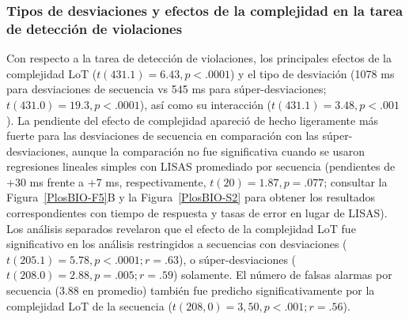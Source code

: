 \subsubsection*{Tipos de desviaciones y efectos de la complejidad en la tarea de detección de violaciones}


Con respecto a la tarea de detección de violaciones, los principales efectos de la complejidad LoT ($t (431.1) = 6.43, p < .0001$) y el tipo de desviación (1078 ms para desviaciones de secuencia vs 545 ms para súper-desviaciones; $t (431.0) = 19.3, p < .0001$), así como su interacción ($t (431.1) = 3.48, p < .001$). La pendiente del efecto de complejidad apareció de hecho ligeramente más fuerte para las desviaciones de secuencia en comparación con las súper-desviaciones, aunque la comparación no fue significativa cuando se usaron regresiones lineales simples con LISAS promediado por secuencia (pendientes de +30 ms frente a +7 ms, respectivamente, $t (20) = 1.87, p = .077$; consultar la Figura~\ref{PlosBIO-F5}B y la Figura~\ref{PlosBIO-S2} para obtener los resultados correspondientes con tiempo de respuesta y tasas de error en lugar de LISAS). Los análisis separados revelaron que el efecto de la complejidad LoT fue significativo en los análisis restringidos a secuencias con desviaciones ($t (205.1) = 5.78, p < .0001; r = .63$), o súper-desviaciones ($t (208.0) = 2.88, p = .005; r = .59$) solamente. El número de falsas alarmas por secuencia (3.88 en promedio) también fue predicho significativamente por la complejidad LoT de la secuencia ($t (208,0) = 3,50, p < .001; r = .56$).

